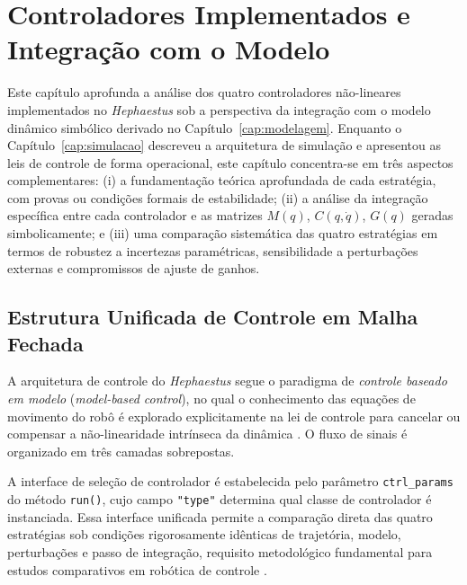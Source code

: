 \chapter{Controladores Implementados e Integração com o Modelo}
\label{cap:controladores}

Este capítulo aprofunda a análise dos quatro controladores não-lineares implementados no \textit{Hephaestus} sob a perspectiva da integração com o modelo dinâmico simbólico derivado no Capítulo~\ref{cap:modelagem}. Enquanto o Capítulo~\ref{cap:simulacao} descreveu a arquitetura de simulação e apresentou as leis de controle de forma operacional, este capítulo concentra-se em três aspectos complementares: (i) a fundamentação teórica aprofundada de cada estratégia, com provas ou condições formais de estabilidade; (ii) a análise da integração específica entre cada controlador e as matrizes $M(q)$, $C(q,\dot{q})$, $G(q)$ geradas simbolicamente; e (iii) uma comparação sistemática das quatro estratégias em termos de robustez a incertezas paramétricas, sensibilidade a perturbações externas e compromissos de ajuste de ganhos.

\section{Estrutura Unificada de Controle em Malha Fechada}
\label{sec:ctrl_framework}

A arquitetura de controle do \textit{Hephaestus} segue o paradigma de \textit{controle baseado em modelo} (\textit{model-based control}), no qual o conhecimento das equações de movimento do robô é explorado explicitamente na lei de controle para cancelar ou compensar a não-linearidade intrínseca da dinâmica \cite{craig1989introduction, spong2020robot, siciliano2009robotics}. O fluxo de sinais é organizado em três camadas sobrepostas.


A interface de seleção de controlador é estabelecida pelo parâmetro \texttt{ctrl\_params} do método \texttt{run()}, cujo campo \texttt{"type"} determina qual classe de controlador é instanciada. Essa interface unificada permite a comparação direta das quatro estratégias sob condições rigorosamente idênticas de trajetória, modelo, perturbações e passo de integração, requisito metodológico fundamental para estudos comparativos em robótica de controle \cite{corke2021toolbox, astrom1995theory}.

